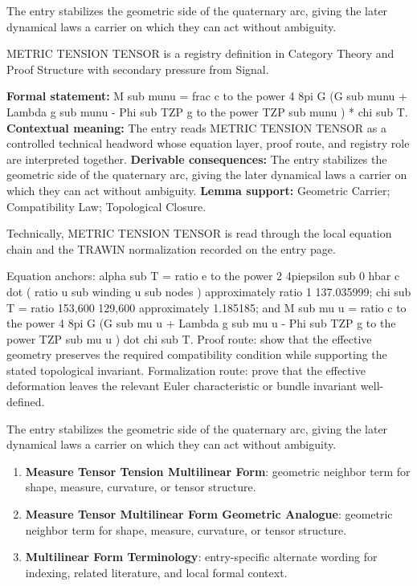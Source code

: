 The entry stabilizes the geometric side of the quaternary arc, giving the later dynamical laws a carrier on which they can act without ambiguity.
\clearpage


\begingroup\small
{}
METRIC TENSION TENSOR is a registry definition in Category Theory and Proof Structure with secondary pressure from Signal.

\begingroup\footnotesize\setlength{\emergencystretch}{3em}\sloppy
\textbf{Formal statement:} M sub munu = frac c to the power 4 8pi G (G sub munu + Lambda g sub munu - Phi sub TZP g to the power TZP sub munu ) * chi sub T. \textbf{Contextual meaning:} The entry reads METRIC TENSION TENSOR as a controlled technical headword whose equation layer, proof route, and registry role are interpreted together. \textbf{Derivable consequences:} The entry stabilizes the geometric side of the quaternary arc, giving the later dynamical laws a carrier on which they can act without ambiguity. \textbf{Lemma support:} Geometric Carrier; Compatibility Law; Topological Closure.\par
\endgroup

Technically, METRIC TENSION TENSOR is read through the local equation chain and the TRAWIN normalization recorded on the entry page.

Equation anchors: alpha sub T = ratio e to the power 2 4piepsilon sub 0 hbar c dot ( ratio u sub winding u sub nodes ) approximately ratio 1 137.035999; chi sub T = ratio 153,600 129,600 approximately 1.185185; and M sub mu u = ratio c to the power 4 8pi G (G sub mu u + Lambda g sub mu u - Phi sub TZP g to the power TZP sub mu u ) dot chi sub T. Proof route: show that the effective geometry preserves the required compatibility condition while supporting the stated topological invariant. Formalization route: prove that the effective deformation leaves the relevant Euler characteristic or bundle invariant well-defined.

The entry stabilizes the geometric side of the quaternary arc, giving the later dynamical laws a carrier on which they can act without ambiguity.
\endgroup

\begin{enumerate}[leftmargin=1.6em,itemsep=6pt,topsep=4pt]
\item \textbf{Measure Tensor Tension Multilinear Form}: geometric neighbor term for shape, measure, curvature, or tensor structure.
\item \textbf{Measure Tensor Multilinear Form Geometric Analogue}: geometric neighbor term for shape, measure, curvature, or tensor structure.
\item \textbf{Multilinear Form Terminology}: entry-specific alternate wording for indexing, related literature, and local formal context.
\end{enumerate}


